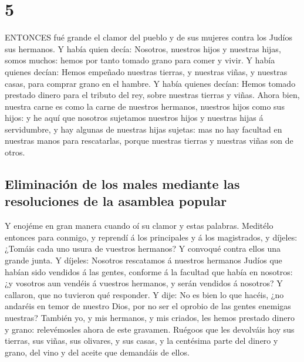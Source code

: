 \hypertarget{section-4}{%
\section{5}\label{section-4}}

 ENTONCES fué grande el clamor del pueblo y de sus mujeres
contra los Judíos sus hermanos.  Y había quien decía:
Nosotros, nuestros hijos y nuestras hijas, somos muchos: hemos por tanto
tomado grano para comer y vivir.  Y había quienes decían:
Hemos empeñado nuestras tierras, y nuestras viñas, y nuestras casas,
para comprar grano en el hambre.  Y había quienes decían:
Hemos tomado prestado dinero para el tributo del rey, sobre nuestras
tierras y viñas.  Ahora bien, nuestra carne es como la carne
de nuestros hermanos, nuestros hijos como sus hijos: y he aquí que
nosotros sujetamos nuestros hijos y nuestras hijas á servidumbre, y hay
algunas de nuestras hijas sujetas: mas no hay facultad en nuestras manos
para rescatarlas, porque nuestras tierras y nuestras viñas son de otros.

\hypertarget{eliminaciuxf3n-de-los-males-mediante-las-resoluciones-de-la-asamblea-popular}{%
\subsection{Eliminación de los males mediante las resoluciones de la
asamblea
popular}\label{eliminaciuxf3n-de-los-males-mediante-las-resoluciones-de-la-asamblea-popular}}

 Y enojéme en gran manera cuando oí su clamor y estas
palabras.  Meditélo entonces para conmigo, y reprendí á los
principales y á los magistrados, y díjeles: ¿Tomáis cada uno usura de
vuestros hermanos? Y convoqué contra ellos una grande junta.
 Y díjeles: Nosotros rescatamos á nuestros hermanos Judíos
que habían sido vendidos á las gentes, conforme á la facultad que había
en nosotros: ¿y vosotros aun vendéis á vuestros hermanos, y serán
vendidos á nosotros? Y callaron, que no tuvieron qué responder.
 Y dije: No es bien lo que hacéis, ¿no andaréis en temor de
nuestro Dios, por no ser el oprobio de las gentes enemigas nuestras?
 También yo, y mis hermanos, y mis criados, les hemos
prestado dinero y grano: relevémosles ahora de este gravamen.
 Ruégoos que les devolváis hoy sus tierras, sus viñas, sus
olivares, y sus casas, y la centésima parte del dinero y grano, del vino
y del aceite que demandáis de ellos.

